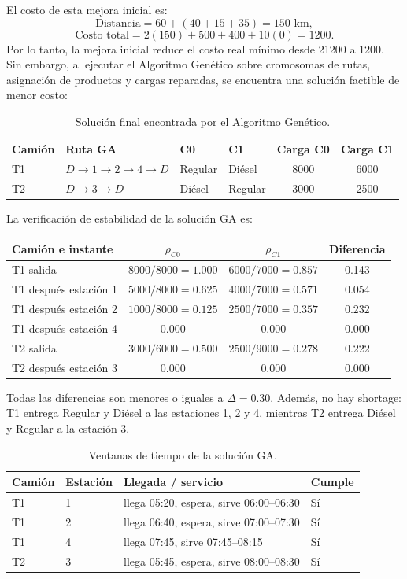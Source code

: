 \documentclass[11pt,letterpaper]{article}
\begin{document}
El costo de esta mejora inicial es:
\[
\text{Distancia}=60+(40+15+35)=150\text{ km},
\]
\[
\text{Costo total}=2(150)+500+400+10(0)=1200.
\]
Por lo tanto, la mejora inicial reduce el costo real mínimo desde 21200 a 1200. Sin
embargo, al ejecutar el Algoritmo Genético sobre cromosomas de rutas, asignación de
productos y cargas reparadas, se encuentra una solución factible de menor costo:

\begin{table}[h]
\centering
\begin{tabular}{llllcc}
\toprule
\textbf{Camión} & \textbf{Ruta GA} & \textbf{C0} & \textbf{C1} & \textbf{Carga C0} & \textbf{Carga C1} \\
\midrule
T1 & \(D\to1\to2\to4\to D\) & Regular & Diésel & 8000 & 6000 \\
T2 & \(D\to3\to D\) & Diésel & Regular & 3000 & 2500 \\
\bottomrule
\end{tabular}
\caption{Solución final encontrada por el Algoritmo Genético.}
\end{table}

La verificación de estabilidad de la solución GA es:

\begin{table}[h]
\centering
\begin{tabular}{lccc}
\toprule
\textbf{Camión e instante} & \(\rho_{C0}\) & \(\rho_{C1}\) & \textbf{Diferencia} \\
\midrule
T1 salida & \(8000/8000=1.000\) & \(6000/7000=0.857\) & 0.143 \\
T1 después estación 1 & \(5000/8000=0.625\) & \(4000/7000=0.571\) & 0.054 \\
T1 después estación 2 & \(1000/8000=0.125\) & \(2500/7000=0.357\) & 0.232 \\
T1 después estación 4 & 0.000 & 0.000 & 0.000 \\
T2 salida & \(3000/6000=0.500\) & \(2500/9000=0.278\) & 0.222 \\
T2 después estación 3 & 0.000 & 0.000 & 0.000 \\
\bottomrule
\end{tabular}
\end{table}

Todas las diferencias son menores o iguales a \(\Delta=0.30\). Además, no hay shortage:
T1 entrega Regular y Diésel a las estaciones 1, 2 y 4, mientras T2 entrega Diésel y
Regular a la estación 3.

\begin{table}[h]
\centering
\begin{tabular}{llll}
\toprule
\textbf{Camión} & \textbf{Estación} & \textbf{Llegada / servicio} & \textbf{Cumple} \\
\midrule
T1 & 1 & llega 05:20, espera, sirve 06:00--06:30 & Sí \\
T1 & 2 & llega 06:40, espera, sirve 07:00--07:30 & Sí \\
T1 & 4 & llega 07:45, sirve 07:45--08:15 & Sí \\
T2 & 3 & llega 05:45, espera, sirve 08:00--08:30 & Sí \\
\bottomrule
\end{tabular}
\caption{Ventanas de tiempo de la solución GA.}
\end{table}
\end{document}
